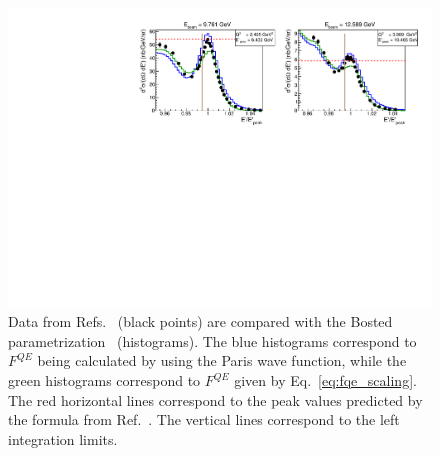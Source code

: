 \afterpage{\clearpage}
\begin{figure}[htp]
\begin{center}
\includegraphics[width=14cm]{pictures/normalization/rock.pdf}
\caption{\small Data from Refs.~\cite{Rock:1991jy,Rock_SLAC} (black points) are compared with the Bosted parametrization~\cite{Bosted_fit,Bosted:2007xd} (histograms). The blue histograms correspond to $F^{QE}$ being calculated by using the Paris wave function, while the green histograms correspond to $F^{QE}$ given by Eq.~\eqref{eq:fqe_scaling}. The red horizontal lines correspond to the peak values predicted by the formula from Ref.~\cite{Kocevar:1967}. The vertical lines correspond to the left integration limits.  } \label{fig:rock_QE}
\end{center}
\end{figure}
